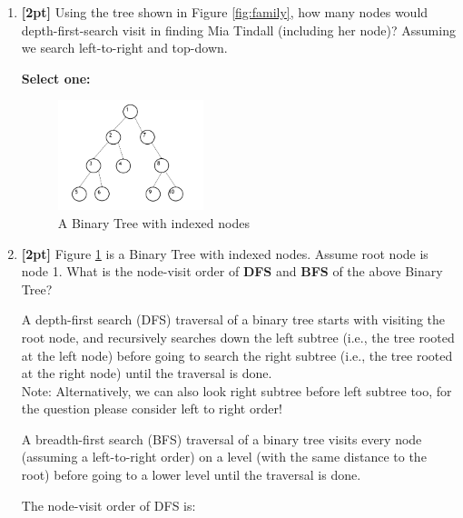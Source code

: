 \documentclass[12pt]{article}
\renewcommand{\circle}{\tikz\draw[black] (0,0) circle (1ex);}
\begin{document}
\begin{enumerate}
    \item \textbf{[2pt]} Using the tree shown in Figure \ref{fig:family}, how many nodes would depth-first-search visit in finding Mia Tindall (including her node)? Assuming we search left-to-right and top-down.

    \textbf{Select one:}


    
    \begin{figure}[H]
        \centering
        \includegraphics[width = 0.4\textwidth]{TreePlot.png}
        \caption{A Binary Tree with indexed nodes}
        \label{tree}
    \end{figure}
    \item \textbf{[2pt]} Figure \ref{tree} is a Binary Tree with indexed nodes. Assume root node is node 1. What is the node-visit order of \textbf{DFS} and \textbf{BFS} of the above Binary Tree? 
    
    A depth-first search (DFS) traversal of a binary tree starts with visiting the root node, and recursively searches down the left subtree (i.e., the tree rooted at the left node) before going to search the right subtree (i.e., the tree rooted at the right node) until the traversal is done.\\
    Note: Alternatively, we can also look right subtree before left subtree too, for the question please consider left to right order!
    
    A breadth-first search (BFS) traversal of a binary tree visits every node (assuming a left-to-right order) on a level (with the same distance to the root) before going to a lower level until the traversal is done.
    
    The node-visit order of DFS is:
    

\end{enumerate}
\end{document}
